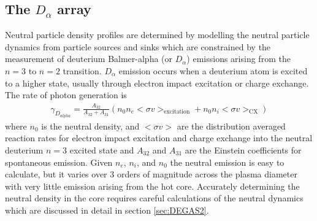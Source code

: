 \subsection{The $D_{\alpha}$ array}\label{sec:dalpha_array}

Neutral particle density profiles are determined by modelling the neutral particle dynamics from particle sources and sinks which are constrained by the measurement of deuterium Balmer-alpha (or $D_{\alpha}$) emissions arising from the $n=3$ to $n=2$ transition. $D_{\alpha}$ emission occurs when a deuterium atom is excited to a higher state, usually through electron impact excitation or charge exchange. The rate of photon generation is
\begin{align}
    \gamma_{D_{alpha}} = \frac{A_{32}}{ A_{32} + A_{31} }\left( n_0 n_e <\sigma v>_{\text{excitation}} + n_0 n_i <\sigma v>_{\text{CX}} \right)
\end{align}
where $n_0$ is the neutral density, and $<\sigma v>$ are the distribution averaged reaction rates for electron impact excitation and charge exchange into the neutral deuterium $n=3$ excited state and $A_{32}$ and $A_{31}$ are the Einstein coefficients for spontaneous emission. Given $n_e$, $n_i$, and $n_0$ the neutral emission is easy to calculate, but it varies over $3$ orders of magnitude across the plasma diameter with very little emission arising from the hot core. Accurately determining the neutral density in the core requires careful calculations of the neutral dynamics which are discussed in detail in section \ref{sec:DEGAS2}.


